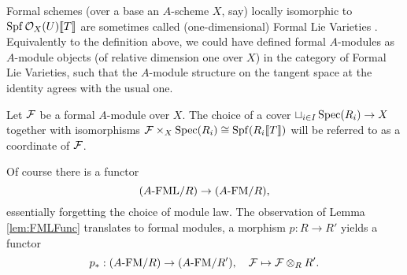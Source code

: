 \documentclass[../main.tex]{subfiles}
\begin{document}
\begin{rmk} 
  Formal schemes (over a base an $A$-scheme $X$, say) locally isomorphic to 
  $\operatorname{Spf} \mathcal{O}_X(U)\llbracket T \rrbracket$ are sometimes called (one-dimensional) Formal
  Lie Varieties . Equivalently to the definition above, we could
  have defined formal $A$-modules as $A$-module objects (of relative dimension one
  over $X$) in the category of Formal Lie Varieties, such that the $A$-module structure
  on the tangent space at the identity agrees with the usual one.
\end{rmk}

\begin{defi}[Coordinate]
  Let $\mathcal{F}$ be a formal $A$-module over $X$. The choice of a cover $\sqcup_{i
  \in I} \operatorname{Spec}(R_i) \to X$ together with isomorphisms $\mathcal{F} \times_X \operatorname{Spec}(R_i)
  \cong \operatorname{Spf}(R_i\llbracket T \rrbracket)$ will be referred to as a coordinate of $\mathcal{F}$. 
\end{defi}

Of course there is a functor 
\begin{equation*}
  {({A}\text-\mathrm{FML}/{R})} \to {({A}\text-\mathrm{FM}/{R})},
\end{equation*}
essentially forgetting the choice of module law. The observation of Lemma 
\ref{lem:FMLFunc} translates to formal modules, a morphism $p : R \to R'$ 
yields a functor 
\begin{equation*} 
  p_*: {({A}\text-\mathrm{FM}/{R})} \to {({A}\text-\mathrm{FM}/{R'})}, \quad \mathcal{F} \mapsto \mathcal{F} \otimes_R R'.
\end{equation*}
\end{document}
